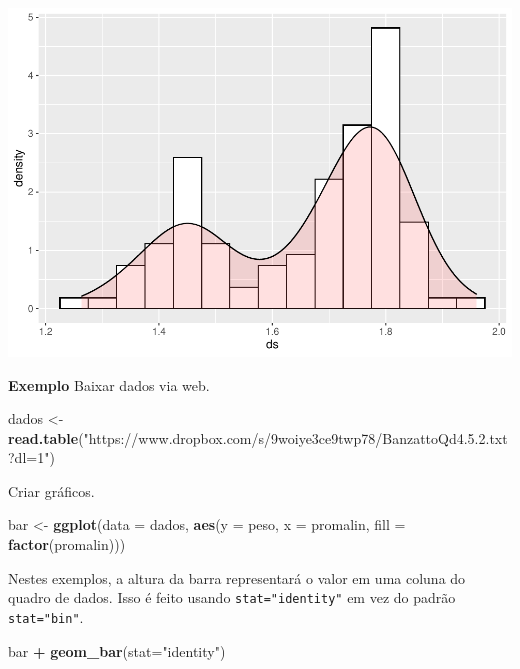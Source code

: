 \documentclass[]{book}
\newenvironment{Shaded}{\begin{snugshade}}{\end{snugshade}}
\newcommand{\DataTypeTok}[1]{\textcolor[rgb]{0.13,0.29,0.53}{#1}}
\newcommand{\KeywordTok}[1]{\textcolor[rgb]{0.13,0.29,0.53}{\textbf{#1}}}
\newcommand{\NormalTok}[1]{#1}
\newcommand{\OperatorTok}[1]{\textcolor[rgb]{0.81,0.36,0.00}{\textbf{#1}}}
\newcommand{\StringTok}[1]{\textcolor[rgb]{0.31,0.60,0.02}{#1}}
\begin{document}
\includegraphics{TudodoR_files/figure-latex/unnamed-chunk-194-1.pdf}

\textbf{Exemplo}
Baixar dados via web.

\begin{Shaded}
\begin{Highlighting}[]
\NormalTok{dados <-}\StringTok{ }\KeywordTok{read.table}\NormalTok{(}\StringTok{"https://www.dropbox.com/s/9woiye3ce9twp78/BanzattoQd4.5.2.txt?dl=1"}\NormalTok{)}
\end{Highlighting}
\end{Shaded}

Criar gráficos.

\begin{Shaded}
\begin{Highlighting}[]
\NormalTok{bar <-}\StringTok{ }\KeywordTok{ggplot}\NormalTok{(}\DataTypeTok{data =}\NormalTok{ dados, }\KeywordTok{aes}\NormalTok{(}\DataTypeTok{y =}\NormalTok{ peso, }\DataTypeTok{x =}\NormalTok{ promalin, }\DataTypeTok{fill =} \KeywordTok{factor}\NormalTok{(promalin)))}
\end{Highlighting}
\end{Shaded}

Nestes exemplos, a altura da barra representará o valor em uma coluna do quadro de dados. Isso é feito usando \texttt{stat="identity"} em vez do padrão \texttt{stat="bin"}.

\begin{Shaded}
\begin{Highlighting}[]
\NormalTok{bar }\OperatorTok{+}\StringTok{  }\KeywordTok{geom_bar}\NormalTok{(}\DataTypeTok{stat=}\StringTok{"identity"}\NormalTok{)}
\end{Highlighting}
\end{Shaded}
\end{document}

